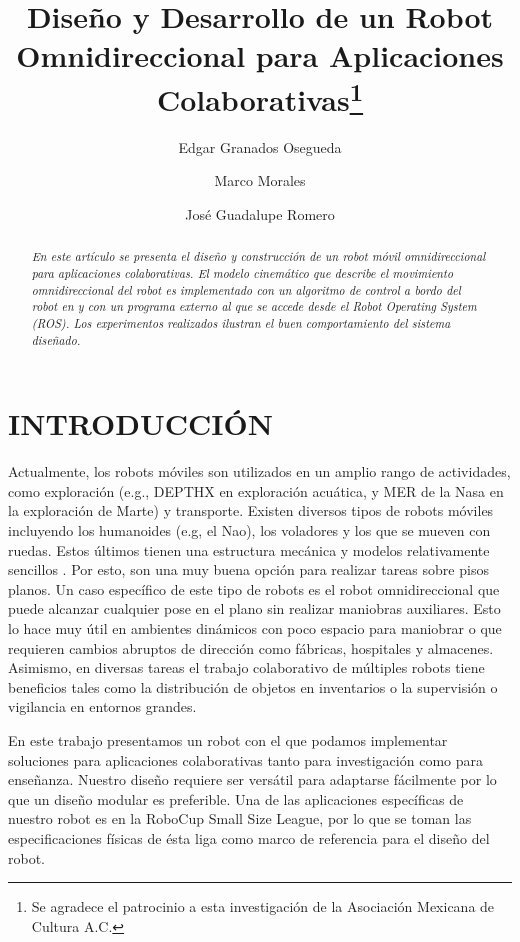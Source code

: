 \documentclass[twocolumn,10pt]{amrob}
\title{Diseño y Desarrollo de un Robot Omnidireccional para Aplicaciones Colaborativas\thanks{Se agradece el patrocinio a esta investigación de la Asociación Mexicana de Cultura A.C.}}
\author{Edgar Granados Osegueda 
    \affiliation{
	Departamento de Sistemas Digitales \\
  ITAM\\
	Rio Hondo 1, Ciudad de México, 01080\\
 	edgar.granados@itam.mx
    }	
}
\author{Marco Morales
\footnotemark[1]
       {\tensfb }      
    \affiliation{
    Departamento de Sistemas Digitales\\
    ITAM\\
  	Rio Hondo 1, Ciudad de México, 01080\\
	marco.morales@itam.mx
    }
}
\author{José Guadalupe Romero
\footnotemark[1]
       {\tensfb }      
    \affiliation{
    Departamento de Sistemas Digitales \\
    ITAM\\
    Rio Hondo 1, Ciudad de México, 01080\\
  	jose.romerovelazquez@itam.mx
    }
}
\newcommand{\TODO}[1]{{\color{red}{TODO: {#1}}}}
\begin{document}
\graphicspath{ {./Figures/} }
\maketitle    

\begin{abstract}
{\it 
En este artículo se presenta el diseño y construcción de un robot móvil omnidireccional para aplicaciones colaborativas. El modelo cinemático que describe  el movimiento omnidireccional del robot es implementado con un algoritmo de control a bordo del robot en \TODO{MM: menciona el hardware del FPGA/micro} y con un programa externo al que se accede desde el Robot Operating System (ROS). Los experimentos realizados ilustran el buen comportamiento del sistema diseñado.
}
\end{abstract}



\section*{INTRODUCCIÓN}

Actualmente, los robots móviles son utilizados en un amplio rango de actividades, como exploración (e.g., DEPTHX en exploración acuática, y MER de la Nasa en la exploración de Marte) y transporte. Existen diversos tipos de robots móviles incluyendo los humanoides (e.g, el Nao), los voladores y los que se mueven con ruedas. Estos últimos tienen una estructura mecánica y modelos relativamente sencillos \cite{corke2011robotics}. Por esto, son una muy buena opción para realizar tareas sobre pisos planos. Un caso específico de este tipo de robots es el robot omnidireccional que puede alcanzar cualquier pose en el plano sin realizar maniobras auxiliares. Esto lo hace muy útil en ambientes dinámicos con poco espacio para maniobrar o que requieren cambios abruptos de dirección como fábricas, hospitales y almacenes. Asimismo, en diversas tareas el trabajo colaborativo de múltiples robots tiene beneficios tales como la distribución de objetos en inventarios o la supervisión o vigilancia en entornos grandes.

En este trabajo presentamos un robot con el que podamos implementar soluciones para aplicaciones colaborativas tanto para investigación como para enseñanza. Nuestro diseño requiere ser versátil para adaptarse fácilmente por lo que un diseño modular es preferible.
Una de las aplicaciones específicas de nuestro robot es en la RoboCup Small Size League, por lo que se toman las especificaciones físicas de ésta liga como marco de referencia para el diseño del robot.
\end{document}
